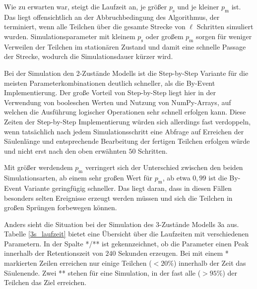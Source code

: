 Wie zu erwarten war, steigt die Laufzeit an, je größer $p_\text{s}$ und je kleiner $p_\text{m}$ ist. Das liegt offensichtlich an der Abbruchbedingung des Algorithmus, der terminiert, wenn alle Teilchen über die gesamte Strecke von $\ell$ Schritten simuliert wurden. Simulationsparameter mit kleinem $p_\text{s}$ oder großem $p_\text{m}$ sorgen für weniger Verweilen der Teilchen im stationären Zustand und damit eine schnelle Passage der Strecke, wodurch die Simulationsdauer kürzer wird. 

Bei der Simulation den 2-Zustände Modells ist die Step-by-Step Variante für die meisten Parameterkombinationen deutlich schneller, als die By-Event Implementierung. Der große Vorteil von Step-by-Step liegt hier in der Verwendung von booleschen Werten und Nutzung von NumPy-Arrays, auf welchen die Ausführung logischer Operationen sehr schnell erfolgen kann. Diese Zeiten der Step-by-Step Implementierung würden sich allerdings fast verdoppeln, wenn tatsächlich nach jedem Simulationsschritt eine Abfrage auf Erreichen der Säulenlänge und entsprechende Bearbeitung der fertigen Teilchen erfolgen würde und nicht erst nach den oben erwähnten $50$ Schritten.

Mit größer werdendem $p_\text{m}$ verringert sich der Unterschied zwischen den beiden Simulationsarten, ab einem sehr großen Wert für $p_{\text{m}}$, ab etwa $0,99$ ist die By-Event Variante geringfügig schneller. Das liegt daran, dass in diesen Fällen besonders selten Ereignisse erzeugt werden müssen und sich die Teilchen in großen Sprüngen forbewegen können. 

Anders sieht die Situation bei der Simulation des 3-Zustände Modells 3a aus. Tabelle \ref{3s_laufzeit} bietet eine Übersicht über die Laufzeiten mit verschiedenen Parametern.
In der Spalte */** ist gekennzeichnet, ob die Parameter einen Peak innerhalb der Retentionszeit von $240$ Sekunden erzeugen. Bei mit einem * markierten Zeilen erreichen nur einige Teilchen ($<20\%$) innerhalb der Zeit das Säulenende. Zwei ** stehen für eine Simulation, in der fast alle ($> 95\%$) der Teilchen das Ziel erreichen.

